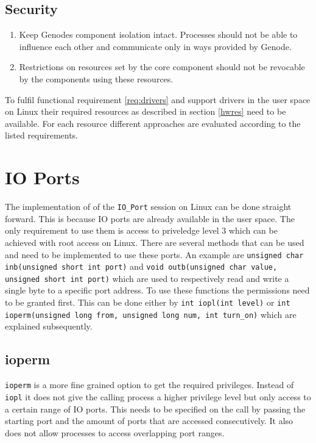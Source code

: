 \documentclass[
a4paper,
11pt,
twoside
]{report}
\begin{document}
		\subsection{Security}
		
		\begin{enumerate}
			\item \label{req:isolation} Keep Genodes component isolation intact.
			Processes should not be able to influence each other and communicate only in ways provided by Genode.
			\item \label{req:traps} Restrictions on resources set by the core component should not be revocable by the components using these resources.
			
		\end{enumerate}
	
		To fulfil functional requirement \ref{req:drivers} and support drivers in the user space on Linux their required resources as described in section \ref{hwres} need to be available.
		For each resource different approaches are evaluated according to the listed requirements.
		
		\section{IO Ports}
		
		The implementation of of the \texttt{IO\_Port} session on Linux can be done straight forward.
		This is because IO ports are already available in the user space.
		The only requirement to use them is access to priveledge level 3 which can be achieved with root access on Linux.
		There are several methods that can be used and need to be implemented to use these ports.
		An example are \texttt{unsigned char inb(unsigned short int port)} and \texttt{void outb(unsigned char value, unsigned short int port)} which are used to respectively read and write a single byte to a specific port address.
		To use these functions the permissions need to be granted first.
		This can be done either by \texttt{int iopl(int level)} or \texttt{int ioperm(unsigned long from, unsigned long num, int turn\_on)} which are explained subsequently. \citep{outb} \citep{ioperm} \citep{iopl}
		
		\subsection{ioperm}
		
		\texttt{ioperm} is a more fine grained option to get the required privileges.
		Instead of \texttt{iopl} it does not give the calling process a higher privilege level but only access to a certain range of IO ports.
		This needs to be specified on the call by passing the starting port and the amount of ports that are accessed consecutively.
		It also does not allow processes to access overlapping port ranges. \citep{ioperm}
		
\end{document}
